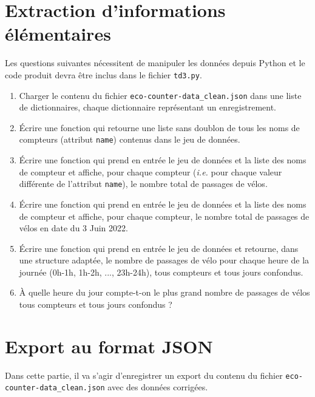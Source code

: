 \documentclass[11pt,a4paper]{article}
\begin{document}
\section{Extraction d'informations élémentaires}

Les questions suivantes nécessitent de manipuler les données depuis Python et le code produit devra être inclus dans le fichier \verb+td3.py+.

\begin{enumerate}
\item Charger le contenu du fichier \verb+eco-counter-data_clean.json+ dans une liste de dictionnaires, chaque dictionnaire représentant un enregistrement.

\item Écrire une fonction qui retourne une liste sans doublon de tous les noms de compteurs (attribut \verb+name+) contenus dans le jeu de données.

\item Écrire une fonction qui prend en entrée le jeu de données et la liste des noms de compteur et affiche, pour chaque compteur (\emph{i.e.} pour chaque valeur différente de l'attribut \verb+name+), le nombre total de passages de vélos.

\item Écrire une fonction qui prend en entrée le jeu de données et la liste des noms de compteur et affiche, pour chaque compteur, le nombre total de passages de vélos en date du 3 Juin 2022.

\item Écrire une fonction qui prend en entrée le jeu de données et retourne, dans une structure adaptée, le nombre de passages de vélo pour chaque heure de la journée (0h-1h, 1h-2h, ..., 23h-24h), tous compteurs et tous jours confondus.

\item À quelle heure du jour compte-t-on le plus grand nombre de passages de vélos tous compteurs et tous jours confondus ?
\end{enumerate}

\section{Export au format JSON}

Dans cette partie, il va s'agir d'enregistrer un export du contenu du fichier \verb+eco-counter-data_clean.json+ avec des données corrigées.
\end{document}
